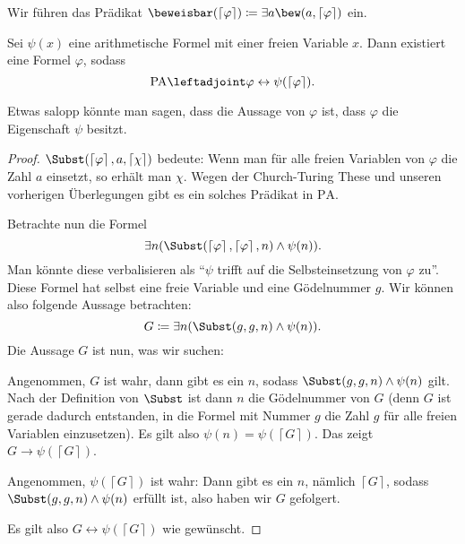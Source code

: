 \documentclass[ngerman]{scrartcl}
\def\shows{\leftadjoint}
\begin{document}
\begin{notation}
  Wir führen das Prädikat $\beweisbar (\left\lceil \varphi  \right\rceil ) \coloneqq \exists a \bew(a, \left\lceil \varphi  \right\rceil )$ ein.
\end{notation}

\begin{lemma}
  Sei $\psi (x)$ eine arithmetische Formel mit einer freien Variable $x$.
  Dann existiert eine Formel $\varphi $, sodass
  \[
    \text{PA} \shows \varphi  \leftrightarrow \psi (\left\lceil \varphi  \right\rceil )
    .
  \]
\end{lemma}

Etwas salopp könnte man sagen, dass die Aussage von $\varphi $ ist,
dass $\varphi $ die Eigenschaft $\psi $ besitzt.

\begin{proof}
  $\Subst(\left\lceil \varphi \right\rceil , a, \left\lceil \chi  \right\rceil )$ bedeute:
  Wenn man für alle freien Variablen von $\varphi $ die Zahl $a$ einsetzt,
  so erhält man $\chi $.
  Wegen der Church-Turing These und unseren vorherigen Überlegungen
  gibt es ein solches Prädikat in $\text{PA}$.

  Betrachte nun die Formel
  \[
    \exists n (\Subst(\left\lceil \varphi  \right\rceil , \left\lceil \varphi  \right\rceil , n) \land \psi (n))
    .
  \]
  Man könnte diese verbalisieren als \enquote{$\psi $ trifft auf die Selbsteinsetzung von $\varphi $ zu}.
  Diese Formel hat selbst eine freie Variable und eine Gödelnummer $g$.
  Wir können also folgende Aussage betrachten:
  \[
    G \coloneqq \exists n (\Subst(g, g, n) \land \psi (n))
    .
  \]
  Die Aussage $G$ ist nun, was wir suchen:

  Angenommen, $G$ ist wahr, dann gibt es ein $n$, sodass $\Subst(g,g,n) \land \psi (n)$ gilt.
  Nach der Definition von $\Subst$ ist dann $n$ die Gödelnummer von $G$
  (denn $G$ ist gerade dadurch entstanden, in die Formel mit Nummer $g$ die Zahl $g$ für alle freien Variablen einzusetzen). Es gilt also $\psi (n) = \psi (\left\lceil G \right\rceil )$. Das zeigt $G \to \psi (\left\lceil G \right\rceil )$.
  
  Angenommen, $\psi (\left\lceil G \right\rceil )$ ist wahr:
  Dann gibt es ein $n$, nämlich $\left\lceil G \right\rceil $,
  sodass $\Subst(g, g, n) \land \psi (n)$ erfüllt ist, also haben wir $G$ gefolgert.

  Es gilt also $G \leftrightarrow \psi (\left\lceil G \right\rceil )$
  wie gewünscht.
\end{proof}
\end{document}
